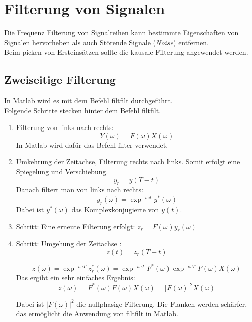 \chapter{Filterung von Signalen}
Die Frequenz Filterung von Signalreihen kann bestimmte Eigenschaften von Signalen hervorheben als auch Störende Signale (\textit{Noise}) entfernen.\\
Beim picken von Ersteinsätzen sollte die kausale Filterung angewendet werden.

\section{Zweiseitige Filterung} 
In Matlab wird es mit dem Befehl filtfilt durchgeführt.\\
Folgende Schritte stecken hinter dem Befehl filtfilt.
\begin{enumerate}
\item Filterung von links nach rechts:
\begin{equation}
Y(\omega) = F(\omega)X(\omega)
\end{equation}
In Matlab wird dafür das Befehl filter verwendet. \\
\item Umkehrung der Zeitachse, Filterung rechts nach links. Somit erfolgt eine Spiegelung und Verschiebung.
\begin{equation}
y_{r} = y(T-t)
\end{equation}
Danach filtert man von links nach rechts:
\begin{equation}
y_{r}(\omega) = \exp^{-i\omega t} y^*(\omega) 
\end{equation}
Dabei ist $y^*(\omega)$ das Komplexkonjugierte von $y(t)$.\\
\item Schritt: Eine erneute Filterung erfolgt: $z_{r}= F(\omega)y_{r}(\omega)$\\
\item Schritt: Umgehung der Zeitachse :
\begin{equation}
z(t)=z_{r}(T-t)
\end{equation}

\begin{equation}
z(\omega)=\exp^{-i\omega T}z_{r}^*(\omega) = \exp^{-i\omega T} F^*(\omega) \exp^{-i\omega T} F(\omega)X(\omega)
\end{equation}
Das ergibt ein sehr einfaches Ergebnis:
\begin{equation}
z(\omega)=   F^*(\omega) F(\omega)X(\omega) = \vert F(\omega) \vert^2 X(\omega)
\end{equation}

Dabei ist $\vert F(\omega) \vert^2$  die nullphasige Filterung. Die Flanken werden schärfer, das ermöglicht die Anwendung von filtfilt in Matlab.
\end{enumerate}

